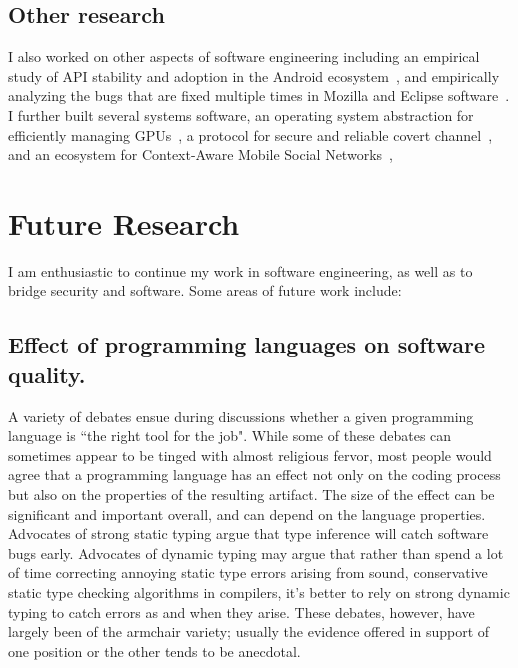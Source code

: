\documentclass[a4paper, 11pt]{article}
\begin{document}
\begin{small}
\subsection*{\small Other research} I also worked on other aspects of software engineering including 
an empirical study of API stability and adoption in the Android ecosystem~\cite{mcdonnell2013empirical}, 
and empirically analyzing the bugs that are fixed multiple times in Mozilla and Eclipse software~\cite{park2012empirical}.
I further built several systems software, \eg an operating system abstraction for efficiently managing GPUs~\cite{rossbach2011ptask}, 
 a protocol for secure and reliable covert channel~\cite{ray2008protocol}, and an ecosystem for Context-Aware Mobile Social Networks~\cite{beach2008whozthat, beach2009touch}, 



\vspace{0.5cm}


\section*{Future Research}

I am enthusiastic to continue my work in software engineering, as well as to bridge security and software. 
Some areas of future work include:

\subsection*{\small Effect of programming languages on software quality.}
A variety of debates ensue during discussions whether a given programming language is ``the
right tool for the job". While some of these debates can sometimes appear to be tinged with
almost religious fervor, most people would agree that a programming language has an effect not
only on the coding process but also on the properties of the resulting artifact. The size of
the effect can be significant and important overall, and can depend on the language
properties. Advocates of strong static typing argue that type inference will catch software bugs early.
Advocates of dynamic typing may argue that rather than spend a lot of time correcting annoying
static type errors arising from sound, conservative static type checking algorithms in
compilers, it's better to rely on strong dynamic typing to catch errors as and when they arise.
These debates, however, have largely been of the armchair variety; usually the evidence offered
in support of one position or the other tends to be anecdotal. 


\end{small}
\end{document}
